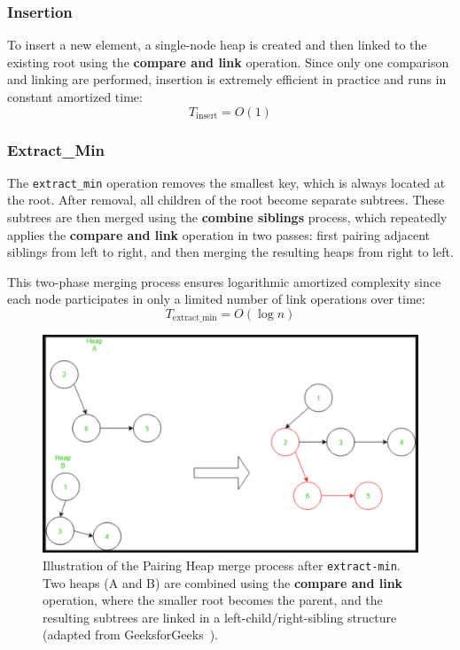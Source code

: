 \documentclass[acmsmall]{acmart}
\begin{document}
\subsubsection*{Insertion}
To insert a new element, a single-node heap is created and then linked to the existing root using the \textbf{compare and link} operation.  
Since only one comparison and linking are performed, insertion is extremely efficient in practice and runs in constant amortized time:
\[
T_{\text{insert}} = O(1)
\]

\subsubsection*{Extract\_Min}
The \texttt{extract\_min} operation removes the smallest key, which is always located at the root. After removal, all children of the root become separate subtrees. These subtrees are then merged using the \textbf{combine siblings} process, which repeatedly applies the \textbf{compare and link} operation in two passes: first pairing adjacent siblings from left to right, and then merging the resulting heaps from right to left.  

This two-phase merging process ensures logarithmic amortized complexity since each node participates in only a limited number of link operations over time:
\[
T_{\text{extract\_min}} = O(\log n)
\]

\begin{figure}[H]
  \centering
  \includegraphics[width=0.8\linewidth]{figs/pairing_heap2.png}
  \caption{Illustration of the Pairing Heap merge process after \texttt{extract-min}. Two heaps (A and B) are combined using the \textbf{compare and link} operation, where the smaller root becomes the parent, and the resulting subtrees are linked in a left-child/right-sibling structure (adapted from GeeksforGeeks~\cite{geeksforgeeks_pairingheap}).}
  \label{fig:pairingheap_merge}
\end{figure}
\end{document}
